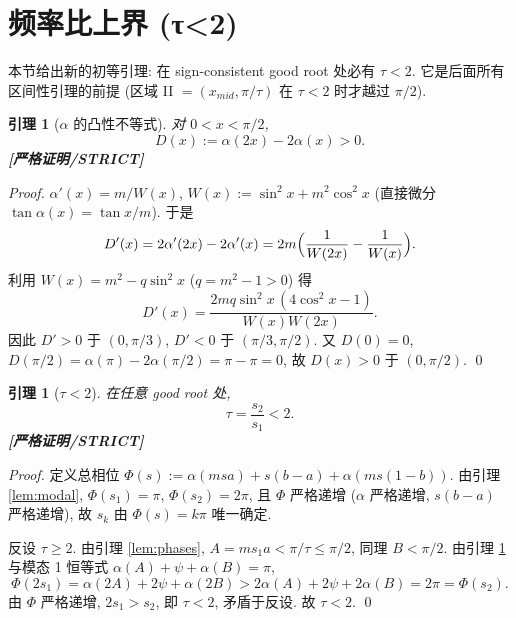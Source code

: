 \documentclass[UTF8]{ctexart}
\newtheorem{lemma}[theorem]{引理}
\newcommand{\STRICT}{\textbf{[严格证明/STRICT]}}
\begin{document}
\section{频率比上界 (τ<2)}\label{sec:tau}

本节给出新的初等引理: 在 sign-consistent good root 处必有 $\tau<2$.
它是后面所有区间性引理的前提 (区域 II $=(x_{mid},\pi/\tau)$ 在 $\tau<2$ 时才越过
$\pi/2$).

\begin{lemma}[$\alpha$ 的凸性不等式]\label{lem:alpha2}
	对 $0<x<\pi/2$,
	\begin{equation}
		D(x):=\alpha(2x)-2\alpha(x)>0.
		\label{eq:Dpos}
	\end{equation}
	\STRICT{}
\end{lemma}

\begin{proof}
	$\alpha'(x)=m/W(x)$, $W(x):=\sin^2x+m^2\cos^2x$ (直接微分
	$\tan\alpha(x)=\tan x/m$). 于是
	\begin{equation}
		D'(x)=2\alpha'(2x)-2\alpha'(x)=2m\Bigl(\frac1{W(2x)}-\frac1{W(x)}\Bigr).
	\end{equation}
	利用 $W(x)=m^2-q\sin^2x$ ($q=m^2-1>0$) 得
	\begin{equation}
		D'(x)=\frac{2mq\sin^2x\,(4\cos^2x-1)}{W(x)W(2x)}.
		\label{eq:Dprime}
	\end{equation}
	因此 $D'>0$ 于 $(0,\pi/3)$, $D'<0$ 于 $(\pi/3,\pi/2)$. 又
	$D(0)=0$, $D(\pi/2)=\alpha(\pi)-2\alpha(\pi/2)=\pi-\pi=0$, 故
	$D(x)>0$ 于 $(0,\pi/2)$. \qed
\end{proof}

\begin{lemma}[$\tau<2$]\label{lem:taubound}
	在任意 good root 处,
	\begin{equation}
		\tau=\frac{s_2}{s_1}<2.
		\label{eq:tault2}
	\end{equation}
	\STRICT{}
\end{lemma}

\begin{proof}
	定义总相位 $\Phi(s):=\alpha(msa)+s(b-a)+\alpha(ms(1-b))$. 由引理
	\ref{lem:modal}, $\Phi(s_1)=\pi$, $\Phi(s_2)=2\pi$, 且 $\Phi$ 严格递增
	($\alpha$ 严格递增, $s(b-a)$ 严格递增), 故 $s_k$ 由 $\Phi(s)=k\pi$ 唯一确定.

	反设 $\tau\ge2$. 由引理 \ref{lem:phases}, $A=ms_1a<\pi/\tau\le\pi/2$,
	同理 $B<\pi/2$. 由引理 \ref{lem:alpha2} 与模态 1 恒等式
	$\alpha(A)+\psi+\alpha(B)=\pi$,
	\begin{equation}
		\Phi(2s_1)=\alpha(2A)+2\psi+\alpha(2B)
		>2\alpha(A)+2\psi+2\alpha(B)=2\pi=\Phi(s_2).
	\end{equation}
	由 $\Phi$ 严格递增, $2s_1>s_2$, 即 $\tau<2$, 矛盾于反设. 故
	$\tau<2$. \qed
\end{proof}
\end{document}
